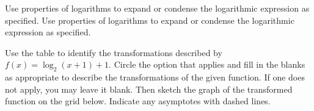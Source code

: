 Use properties of logarithms to expand or condense the logarithmic expression as specified.
\question 
Use properties of logarithms to expand or condense the logarithmic expression as specified.\\
\answerline


\question[6] \label{exact-start}
Use the table to identify the transformations described by \(f(x) = \log_{2}(x + 1) + 1\). Circle the option that applies and fill in the blanks as appropriate to describe the transformations of the given function. If one does not apply, you may leave it blank. Then sketch the graph of the transformed function on the grid below. Indicate any asymptotes with dashed lines. 

